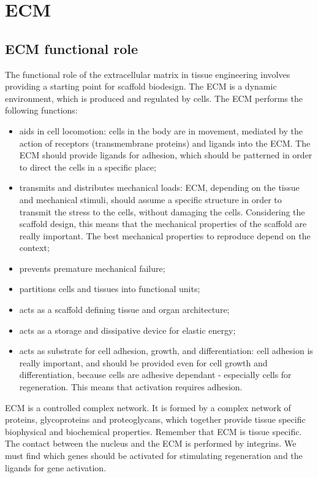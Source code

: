 \graphicspath{{chapters/ecm/}}
\chapter{ECM}

\section{ECM functional role}
The functional role of the extracellular matrix in tissue engineering involves providing a starting point for scaffold biodesign. 
The ECM is a dynamic environment, which is produced and regulated by cells.
The ECM performs the following functions:
\begin{itemize}
\item aids in cell locomotion: cells in the body are in movement, mediated by the action of receptors (transmembrane proteins) and ligands into the ECM. The ECM should provide ligands for adhesion, which should be patterned in order to direct the cells in a specific place;
\item transmits and distributes mechanical loads: ECM, depending on the tissue and mechanical stimuli, should assume a specific structure in order to transmit the stress to the cells, without damaging the cells. Considering the scaffold design, this means that the mechanical properties of the scaffold are really important. The best mechanical properties to reproduce depend on the context;
\item prevents premature mechanical failure;
\item partitions cells and tissues into functional units;
\item acts as a scaffold defining tissue and organ architecture;
\item acts as a storage and dissipative device for elastic energy;
\item acts as substrate for cell adhesion, growth, and differentiation: cell adhesion is really important, and should be provided even for cell growth and differentiation, because cells are adhesive dependant - especially cells for regeneration. This means that activation requires adhesion.
\end{itemize}
\noindent
ECM is a controlled complex network. It is formed by a complex network of proteins, glycoproteins and proteoglycans, which together provide tissue specific biophysical and biochemical properties. Remember that ECM is tissue specific. The contact between the nucleus and the ECM is performed by integrins. We must find which genes should be activated for stimulating regeneration and the ligands for gene activation.
